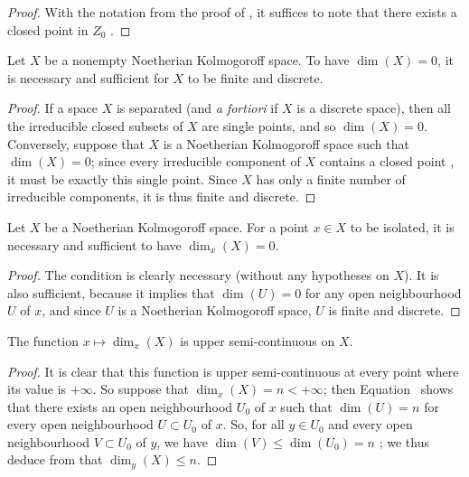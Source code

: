 \begin{proof}
\label{proof-0.14.1.8}
With the notation from the proof of , it suffices to note that there exists a closed point in $Z_0$ .
\end{proof}

\begin{prop}[14.1.9]
\label{0.14.1.9}
Let $X$ be a nonempty Noetherian Kolmogoroff space.
To have $\dim(X)=0$, it is necessary and sufficient for $X$ to be finite and discrete.
\end{prop}

\begin{proof}
\label{proof-0.14.1.9}
If a space $X$ is separated (and \emph{a fortiori} if $X$ is a discrete space), then all the irreducible closed subsets of $X$ are single points, and so $\dim(X)=0$.
Conversely, suppose that $X$ is a Noetherian Kolmogoroff space such that $\dim(X)=0$;
since every irreducible component of $X$ contains a closed point , it must be exactly this single point.
Since $X$ has only a finite number of irreducible components, it is thus finite and discrete.
\end{proof}

\begin{cor}[14.1.10]
\label{0.14.1.10}
Let $X$ be a Noetherian Kolmogoroff space.
For a point $x\in X$ to be isolated, it is necessary and sufficient to have $\dim_x(X)=0$.
\end{cor}

\begin{proof}
\label{proof-0.14.1.10}
The condition is clearly necessary (without any hypotheses on $X$).
It is also sufficient,
because it implies that $\dim(U)=0$ for any open neighbourhood $U$ of $x$, and since $U$ is a Noetherian Kolmogoroff space, $U$ is finite and discrete.
\end{proof}

\begin{prop}[14.1.11]
\label{0.14.1.11}
The function $x\mapsto\dim_x(X)$ is upper semi-continuous on $X$.
\end{prop}

\begin{proof}
\label{proof-0.14.1.11}
It is clear that this function is upper semi-continuous at every point where its value is $+\infty$.
So suppose that $\dim_x(X)=n<+\infty$;
then Equation~ shows that there exists an open neighbourhood $U_0$ of $x$ such that $\dim(U)=n$ for every open neighbourhood $U\subset U_0$ of $x$.
So, for all $y\in U_0$ and every open neighbourhood $V\subset U_0$ of $y$, we have $\dim(V)\leq\dim(U_0)=n$ ;
we thus deduce from  that $\dim_y(X)\leq n$.
\end{proof}

